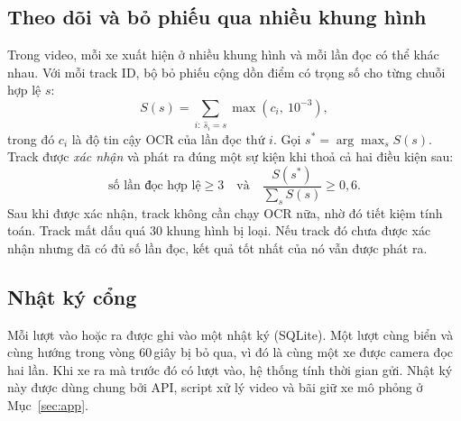 \subsection{Theo dõi và bỏ phiếu qua nhiều khung hình}
Trong video, mỗi xe xuất hiện ở nhiều khung hình và mỗi lần đọc có thể khác nhau. Với mỗi track ID, bộ bỏ phiếu cộng dồn điểm có trọng số cho từng chuỗi hợp lệ $s$:
\begin{equation}
  S(s) = \sum_{i:\ \hat{s}_i = s} \max(c_i,\ 10^{-3}),
\end{equation}
trong đó $c_i$ là độ tin cậy OCR của lần đọc thứ $i$. Gọi $s^\ast = \arg\max_s S(s)$. Track được \emph{xác nhận} và phát ra đúng một sự kiện khi thoả cả hai điều kiện sau:
\begin{equation}
  \text{số lần đọc hợp lệ} \geq 3
  \quad\text{và}\quad
  \frac{S(s^\ast)}{\sum_s S(s)} \geq 0{,}6 .
\end{equation}
Sau khi được xác nhận, track không cần chạy OCR nữa, nhờ đó tiết kiệm tính toán. Track mất dấu quá 30 khung hình bị loại. Nếu track đó chưa được xác nhận nhưng đã có đủ số lần đọc, kết quả tốt nhất của nó vẫn được phát ra.

\subsection{Nhật ký cổng}
Mỗi lượt vào hoặc ra được ghi vào một nhật ký (SQLite). Một lượt cùng biển và cùng hướng trong vòng 60\,giây bị bỏ qua, vì đó là cùng một xe được camera đọc hai lần. Khi xe ra mà trước đó có lượt vào, hệ thống tính thời gian gửi. Nhật ký này được dùng chung bởi API, script xử lý video  và bãi giữ xe mô phỏng ở Mục~\ref{sec:app}.
